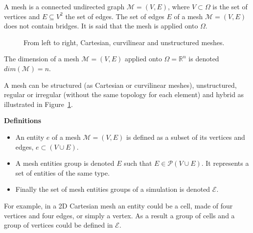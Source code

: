 \begin{mydef}
A mesh is a connected undirected graph $\mathcal{M}=(V,E)$, where $V\subset \Omega$ is the set of vertices and $E\subseteq V^2$ the set of edges. The set of edges $E$ of a mesh $\mathcal{M}=(V,E)$ does not contain bridges. It is said that the mesh is applied onto $\Omega$.
\end{mydef}
\begin{figure}[!h]\begin{center}
  \caption{From left to right, Cartesian, curvilinear and unstructured meshes.}
  \label{fig:mesh}
\end{center}\end{figure}
\begin{mydef}
The dimension of a mesh $\mathcal{M}=(V,E)$ applied onto $\Omega=\mathbb{R}^n$ is denoted $dim(\mathcal{M})=n$.
\end{mydef}
A mesh can be structured (as Cartesian or curvilinear meshes), unstructured, regular or irregular (without the same topology for each element) and hybrid as illustrated in Figure~\ref{fig:mesh}.

\medskip
\noindent \textbf{Definitions}
\begin{itemize}
\item An entity $e$ of a mesh $\mathcal{M}=(V,E)$ is defined as a subset of its vertices and edges, $e\subset (V\cup E)$.
\item A mesh entities group is denoted $E$ such that $E \in \mathcal{P}(V\cup E)$. It represents a set of entities of the same type.
\item Finally the set of mesh entities groups of a simulation is denoted $\mathcal{E}$.
\end{itemize}

For example, in a 2D Cartesian mesh an entity could be a cell, made of four vertices and four edges, or simply a vertex. As a result a group of cells and a group of vertices could be defined in $\mathcal{E}$. %

